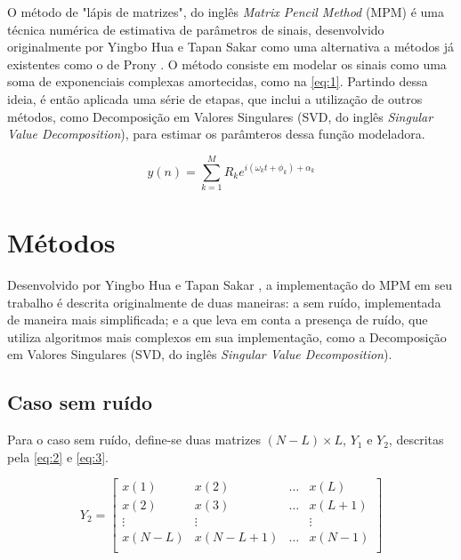 \documentclass[12pt]{article}
\begin{document}
O método de "lápis de matrizes", do inglês \textit{Matrix Pencil Method} (MPM) é uma técnica numérica
de estimativa de parâmetros de sinais, desenvolvido originalmente por Yingbo Hua e Tapan Sakar \cite{370583} como uma alternativa a métodos já existentes 
como o de Prony \cite{49090}. O método consiste em modelar os sinais como uma soma de exponenciais complexas amortecidas, como na \autoref{eq:1}. Partindo 
dessa ideia, é então aplicada uma série de etapas, que inclui a utilização de outros métodos, como Decomposição em Valores Singulares (SVD, do inglês \textit{Singular Value Decomposition}), 
para estimar os parâmteros dessa função modeladora.  

\begin{equation} \label{eq:1}
    y(n) = \sum_{k=1}^{M} R_k e^{i (\omega_k t + \phi_k) + \alpha_k }
\end{equation}

\section{Métodos}

Desenvolvido por Yingbo Hua e Tapan Sakar \cite{370583}, a implementação do MPM em seu trabalho é descrita originalmente de duas maneiras: a sem ruído, 
implementada de maneira mais simplificada; e a que leva em conta a presença de ruído, que utiliza algoritmos mais complexos em sua implementação, como a
Decomposição em Valores Singulares (SVD, do inglês \textit{Singular Value Decomposition}).

\subsection{Caso sem ruído}

Para o caso sem ruído, define-se duas matrizes $(N-L) \times L$, $Y_1$ e $Y_2$, descritas pela \autoref{eq:2} e \autoref{eq:3}.

\begin{equation} \label{eq:2}
    Y_2 = \begin{bmatrix} x(1) & x(2) & \dots & x(L) \\
                            x(2) & x(3) & \dots & x(L + 1) \\
                            \vdots & \vdots & & \vdots \\
                            x(N-L) & x(N - L + 1) & \dots & x(N-1) \\
    \end{bmatrix}
\end{equation}
\end{document}
